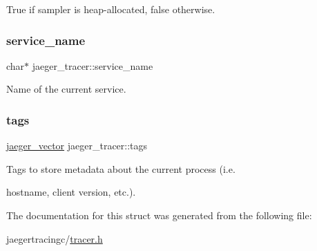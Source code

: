 True if sampler is heap-\/allocated, false otherwise. 

\mbox{\label{structjaeger__tracer_a2f266f1e4c48383eb3460f3a042a14c3}} 
\subsubsection{\texorpdfstring{service\+\_\+name}{service\_name}}
{\footnotesize\ttfamily char$\ast$ jaeger\+\_\+tracer\+::service\+\_\+name}



Name of the current service. 

\mbox{\label{structjaeger__tracer_a6e776148ebfb95dc49bbf018b58841e5}} 
\subsubsection{\texorpdfstring{tags}{tags}}
{\footnotesize\ttfamily \mbox{\hyperlink{structjaeger__vector}{jaeger\+\_\+vector}} jaeger\+\_\+tracer\+::tags}



Tags to store metadata about the current process (i.\+e. 

hostname, client version, etc.). 

The documentation for this struct was generated from the following file\+:\begin{DoxyCompactItemize}
\item 
jaegertracingc/\mbox{\hyperlink{tracer_8h}{tracer.\+h}}\end{DoxyCompactItemize}
